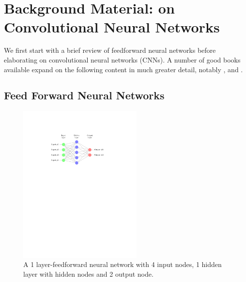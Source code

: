 \chapter{Background Material: on Convolutional Neural Networks}

\noindent We first start with a brief review of feedforward neural networks before elaborating on convolutional neural networks (CNNs). A number of good books available expand on the following content in much greater detail, notably \citep{Bengio-et-al-2015-Book}, \citep{Bishop:1995:NNP:525960} and \citep{Nielsen}.

\section{Feed Forward Neural Networks}

\begin{figure}
\centering
\label{Basic_neural_network}
\includegraphics[trim=4cm 17cm 3cm 4cm, clip=true, height=80mm]{Tikz/NN.pdf}
\caption{A 1 layer-feedforward neural network with 4 input nodes, 1 hidden layer with hidden nodes and 2 output node.}
\end{figure}

